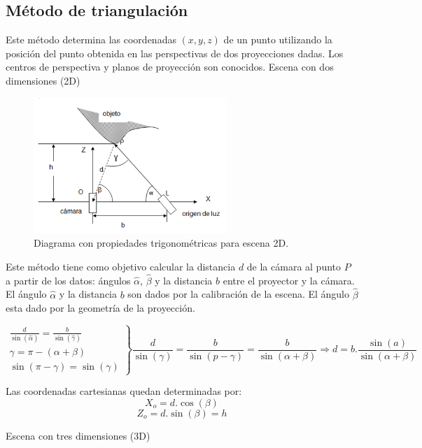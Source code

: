 \subsection{Método de triangulación}
Este método determina las coordenadas $(x,y,z)$ de un punto utilizando la posición del punto obtenida en las perspectivas de dos proyecciones dadas.
Los centros de perspectiva y planos de proyección son conocidos\cite{PresUnivYonsei}.
Escena con dos dimensiones (2D)

\begin{figure}[H]
  \centering
    \includegraphics[width=0.65\textwidth]{./Cap6_reconstruccion/triangulacion.PNG}
  \caption{Diagrama con propiedades trigonométricas para escena 2D.}
  \label{fig:Triangulacion}
\end{figure}

Este método tiene como objetivo calcular la distancia $d$ de la cámara al punto $P$ a partir de los datos: ángulos $\hat\alpha$, $\hat\beta$ y la distancia $b$ entre el proyector y la cámara.
El ángulo $\hat\alpha$ y la distancia $b$ son dados por la calibración de la escena.
El ángulo $\hat\beta$ esta dado por la geometría de la proyección.

\[
\left.
\begin{array}{l}
\frac{d}{\sin (\hat\alpha)} = \frac{b}{\sin (\hat\gamma)} 	\\
\gamma = \pi - (\alpha + \beta)								\\
\sin (\pi - \gamma) = \sin (\gamma)
\end{array}
\right \rbrace
\frac{d}{\sin(\gamma)} = \frac{b}{\sin(p - \gamma)} = \frac{b}{\sin(\alpha + \beta)} \Rightarrow d = b . \frac{\sin(a)}{\sin(\alpha + \beta)}
\]

Las coordenadas cartesianas quedan determinadas por:
\[
X_o = d. \cos (\beta)
\]
\[
Z_o = d. \sin (\beta) = h
\]

Escena con tres dimensiones (3D)

